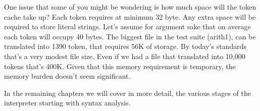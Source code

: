 One issue that some of you might be wondering is how much space will the token cache take up? Each token requires at minimum 32 byte. Any extra space will be required to store literal strings. Let's assume for argument sake that on average each token will occupy 40 bytes. The biggest file in the test suite (arith1), can be translated into 1390 token, that requires 56K of storage. By today's standards that's a very modest file size. Even if we had a file that translated into 10,000 tokens that's 400K. Given that this memory requirement is temporary, the memory burden doesn't seem significant.

In the remaining chapters we will cover in more detail, the various stages of the interpreter starting with syntax analysis.

%
%
%
%
%
%
%
%
%
%
%
